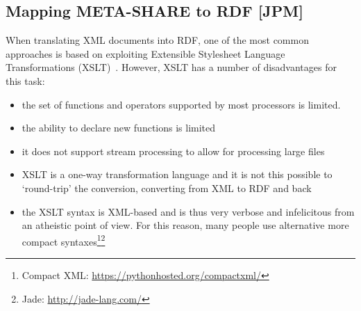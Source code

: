 \documentclass{llncs}
\begin{document}
{\subsection{Mapping META-SHARE to RDF [JPM]}

\label{sec:conversion}

When translating XML documents into RDF, one of the most common approaches is
based on exploiting Extensible Stylesheet Language Transformations
(XSLT)~\cite{wustner2002converting,van2008xml,borin2014representing}. However, XSLT has a number of disadvantages
for this task:
\begin{itemize}
\item the set of functions and operators supported by most processors is
limited.
\item the ability to declare new functions is limited
\item it does not support stream processing to allow for processing large files 
\item XSLT is a one-way transformation language and it is not this possible
to `round-trip' the conversion, converting from XML to RDF and back
\item the XSLT syntax is XML-based and is thus very verbose and infelicitous from an atheistic point of view.
For this reason, many people use alternative
more compact syntaxes\footnote{Compact XML:
\url{https://pythonhosted.org/compactxml/}}\footnote{Jade:
\url{http://jade-lang.com/}}
\end{itemize}

}
\end{document}
